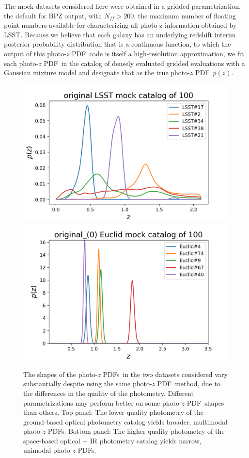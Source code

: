 \documentclass[\docopts]{\docclass}
\newcommand{\pz}{photo-$z$ PDF}
\begin{document}
The mock datasets considered here were obtained in a gridded parametrization, 
the default for BPZ output, with $N_{ff}>200$, the maximum number of floating 
point numbers available for characterizing all photo-z information obtained by 
LSST.  \citep{juric_data_2017}  Because we believe that each galaxy has an 
underlying redshift interim posterior probability distribution that is a 
continuous function, to which the output of this \pz\ code is itself a 
high-resolution approximation, we fit each \pz\ in the catalog of densely 
evaluated gridded evaluations with a Gaussian mixture model and designate that 
as the true \pz\ $p(z)$.

\begin{figure}
  \includegraphics[width=0.9\columnwidth]{figures/lsst_pz_placeholder.png}\\
  \includegraphics[width=0.9\columnwidth]{figures/euclid_pz_placeholder.png}
  \caption{The shapes of the \pz s\ in the two datasets considered vary 
substantially despite using the same \pz\ method, due to the differences in the 
quality of the photometry.  Different parametrizations may perform better on 
some \pz\ shapes than others.  Top panel: The lower quality photometry of the 
ground-based optical photometry catalog yields broader, multimodal \pz s. 
Bottom panel: The higher quality photometry of the space-based optical + IR 
photometry catalog yields narrow, unimodal \pz s.
  \label{fig:pzs}}
\end{figure}
\end{document}
